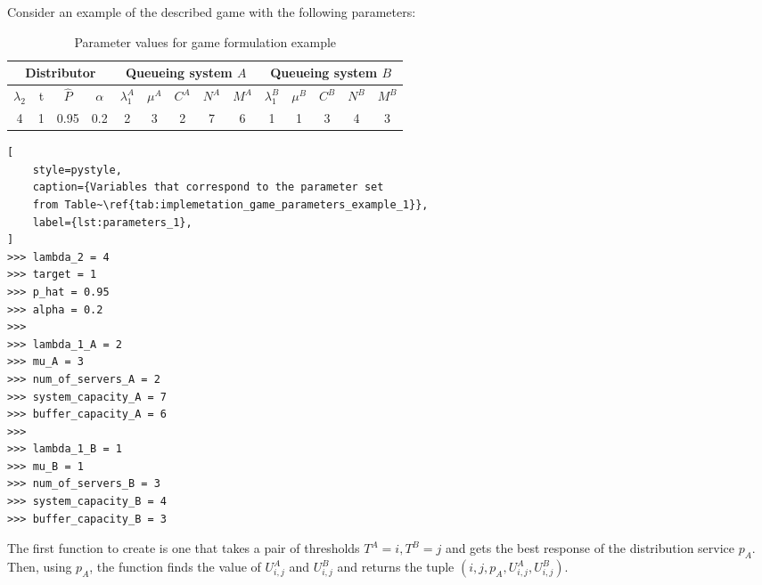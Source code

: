 Consider an example of the described game with the following parameters:

\begin{table}[H]
    \caption{Parameter values for game formulation example}
    \begin{center}
        \begin{tabular}{||c|c|c|c||c|c|c|c|c||c|c|c|c|c||}
            \hline
            \multicolumn{4}{||c||}{\textbf{Distributor}} &
            \multicolumn{5}{c||}{\textbf{Queueing system \(A\)}} &
            \multicolumn{5}{c||}{\textbf{Queueing system \(B\)}} \\
            \hline
            \(\lambda_2\) & t & \footnotesize{\(\hat{P}\)} & \(\alpha\) &
            \(\lambda_1^A\) & \(\mu^A\) & \(C^A\) & \(N^A\) & \(M^A\) &
            \(\lambda_1^B\) & \(\mu^B\) & \(C^B\) & \(N^B\) & \(M^B\) \\
            \hline
            4 & 1 & 0.95 & 0.2 & 2 & 3 & 2 & 7 & 6 & 1 & 1 & 3 & 4 & 3 \\
            \hline
        \end{tabular}
    \end{center}
    \label{tab:implemetation_game_parameters_example_1}
\end{table}


\begin{lstlisting}[
    style=pystyle,
    caption={Variables that correspond to the parameter set
    from Table~\ref{tab:implemetation_game_parameters_example_1}},
    label={lst:parameters_1},
]
>>> lambda_2 = 4
>>> target = 1
>>> p_hat = 0.95
>>> alpha = 0.2
>>> 
>>> lambda_1_A = 2
>>> mu_A = 3
>>> num_of_servers_A = 2
>>> system_capacity_A = 7
>>> buffer_capacity_A = 6
>>> 
>>> lambda_1_B = 1
>>> mu_B = 1
>>> num_of_servers_B = 3
>>> system_capacity_B = 4
>>> buffer_capacity_B = 3

\end{lstlisting}

The first function to create is one that takes a pair of thresholds \(T^A=i,
T^B=j\) and gets the best response of the distribution service \(p_A\).
Then, using \(p_A\), the function finds the value of \(U_{i,j}^A\) and
\(U_{i,j}^B\) and returns the tuple \((i, j, p_A, U_{i,j}^A, U_{i,j}^B)\).

